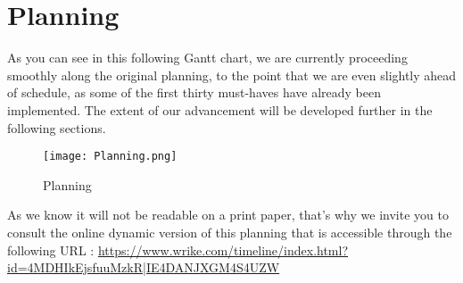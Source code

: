 \section{Planning}

As you can see in this following Gantt chart, we are currently proceeding smoothly along the original planning, to the point that we are even slightly ahead of schedule, as some of the first thirty must-haves have already been implemented. The extent of our advancement will be developed further in the following sections. \newline

\begin{figure}[H]
	\centering
	\texttt{[image: Planning.png]}
	\caption{Planning}
	\label{planning}
\end{figure}

As we know it will not be readable on a print paper, that's why we invite you to consult the
online dynamic version of this planning that is accessible through the
following URL :
\url{https://www.wrike.com/timeline/index.html?id=4MDHIkEjsfuuMzkR|IE4DANJXGM4S4UZW}
